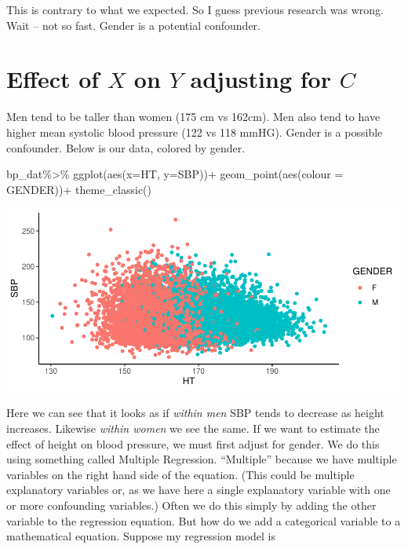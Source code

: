 \documentclass[
]{book}
\newenvironment{Shaded}{\begin{snugshade}}{\end{snugshade}}
\newcommand{\AttributeTok}[1]{\textcolor[rgb]{0.77,0.63,0.00}{#1}}
\newcommand{\FunctionTok}[1]{\textcolor[rgb]{0.00,0.00,0.00}{#1}}
\newcommand{\NormalTok}[1]{#1}
\newcommand{\SpecialCharTok}[1]{\textcolor[rgb]{0.00,0.00,0.00}{#1}}
\newcommand{\StringTok}[1]{\textcolor[rgb]{0.31,0.60,0.02}{#1}}
\begin{document}
This is contrary to what we expected. So I guess previous research was wrong. Wait -- not so fast. Gender is a potential confounder.

\hypertarget{effect-of-x-on-y-adjusting-for-c}{%
\section{\texorpdfstring{Effect of \(X\) on \(Y\) adjusting for \(C\)}{Effect of X on Y adjusting for C}}\label{effect-of-x-on-y-adjusting-for-c}}

Men tend to be taller than women (175 cm vs 162cm). Men also tend to have higher mean systolic blood pressure (122 vs 118 mmHG). Gender is a possible confounder. Below is our data, colored by gender.

\begin{Shaded}
\begin{Highlighting}[]
\NormalTok{bp\_dat}\SpecialCharTok{\%\textgreater{}\%}
  \FunctionTok{ggplot}\NormalTok{(}\FunctionTok{aes}\NormalTok{(}\AttributeTok{x=}\StringTok{\textasciigrave{}}\AttributeTok{HT}\StringTok{\textasciigrave{}}\NormalTok{,}
             \AttributeTok{y=}\StringTok{\textasciigrave{}}\AttributeTok{SBP}\StringTok{\textasciigrave{}}\NormalTok{))}\SpecialCharTok{+}
  \FunctionTok{geom\_point}\NormalTok{(}\FunctionTok{aes}\NormalTok{(}\AttributeTok{colour =}\NormalTok{ GENDER))}\SpecialCharTok{+}
  \FunctionTok{theme\_classic}\NormalTok{()}
\end{Highlighting}
\end{Shaded}

\includegraphics{MA206supplement_files/figure-latex/unnamed-chunk-5-1.pdf}

Here we can see that it looks as if \emph{within men} SBP tends to decrease as height increases. Likewise \emph{within women} we see the same. If we want to estimate the effect of height on blood pressure, we must first adjust for gender. We do this using something called Multiple Regression. ``Multiple'' because we have multiple variables on the right hand side of the equation. (This could be multiple explanatory variables or, as we have here a single explanatory variable with one or more confounding variables.) Often we do this simply by adding the other variable to the regression equation. But how do we add a categorical variable to a mathematical equation. Suppose my regression model is
\end{document}

